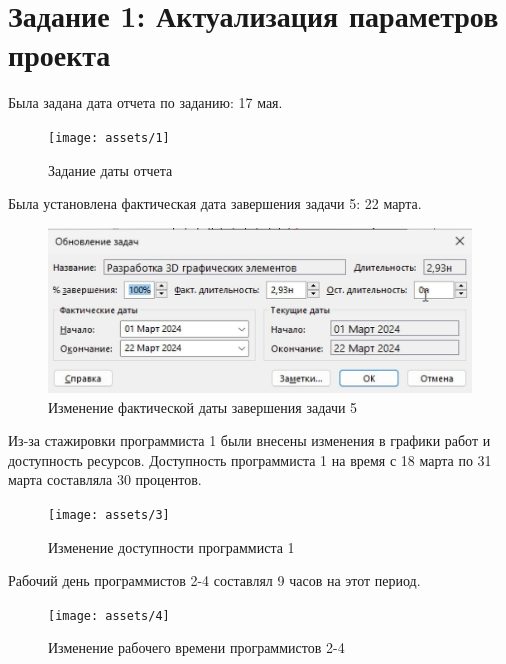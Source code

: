 \section{Задание 1: Актуализация параметров проекта}

Была задана дата отчета по заданию: 17 мая.

\begin{figure}[H]
    \begin{center}
    \texttt{[image: assets/1]}
    \caption{Задание даты отчета}
    \label{fig:1}
    \end{center}
\end{figure}

Была установлена фактическая дата завершения задачи 5: 22 марта.

\begin{figure}[H]
    \begin{center}
    \includegraphics[width=1\linewidth]{assets/2}
    \caption{Изменение фактической даты завершения задачи 5}
    \label{fig:2}
    \end{center}
\end{figure}

Из-за стажировки программиста 1 были внесены изменения в графики работ и доступность ресурсов. Доступность программиста 1 на время с 18 марта по 31 марта составляла 30 процентов.

\begin{figure}[H]
    \begin{center}
    \texttt{[image: assets/3]}
    \caption{Изменение доступности программиста 1}
    \label{fig:3}
    \end{center}
\end{figure}

Рабочий день программистов 2-4 составлял 9 часов на этот период.

\begin{figure}[H]
    \begin{center}
    \texttt{[image: assets/4]}
    \caption{Изменение рабочего времени программистов 2-4}
    \label{fig:4}
    \end{center}
\end{figure}

